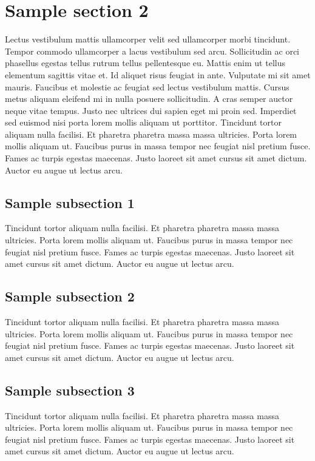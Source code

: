 \documentclass[a4paper, 12pt]{report}
\begin{document}
\section{Sample section 2}
Lectus vestibulum mattis ullamcorper velit sed ullamcorper morbi tincidunt. Tempor commodo ullamcorper a lacus vestibulum sed arcu. Sollicitudin ac orci phasellus egestas tellus rutrum tellus pellentesque eu. Mattis enim ut tellus elementum sagittis vitae et. Id aliquet risus feugiat in ante. Vulputate mi sit amet mauris. Faucibus et molestie ac feugiat sed lectus vestibulum mattis. Cursus metus aliquam eleifend mi in nulla posuere sollicitudin. A cras semper auctor neque vitae tempus. Justo nec ultrices dui sapien eget mi proin sed. Imperdiet sed euismod nisi porta lorem mollis aliquam ut porttitor. Tincidunt tortor aliquam nulla facilisi. Et pharetra pharetra massa massa ultricies. Porta lorem mollis aliquam ut. Faucibus purus in massa tempor nec feugiat nisl pretium fusce. Fames ac turpis egestas maecenas. Justo laoreet sit amet cursus sit amet dictum. Auctor eu augue ut lectus arcu.

\subsection{Sample subsection 1}
 Tincidunt tortor aliquam nulla facilisi. Et pharetra pharetra massa massa ultricies. Porta lorem mollis aliquam ut. Faucibus purus in massa tempor nec feugiat nisl pretium fusce. Fames ac turpis egestas maecenas. Justo laoreet sit amet cursus sit amet dictum. Auctor eu augue ut lectus arcu.
 
\subsection{Sample subsection 2}
 Tincidunt tortor aliquam nulla facilisi. Et pharetra pharetra massa massa ultricies. Porta lorem mollis aliquam ut. Faucibus purus in massa tempor nec feugiat nisl pretium fusce. Fames ac turpis egestas maecenas. Justo laoreet sit amet cursus sit amet dictum. Auctor eu augue ut lectus arcu.
 
\subsection{Sample subsection 3}
 Tincidunt tortor aliquam nulla facilisi. Et pharetra pharetra massa massa ultricies. Porta lorem mollis aliquam ut. Faucibus purus in massa tempor nec feugiat nisl pretium fusce. Fames ac turpis egestas maecenas. Justo laoreet sit amet cursus sit amet dictum. Auctor eu augue ut lectus arcu.
 
\end{document}
